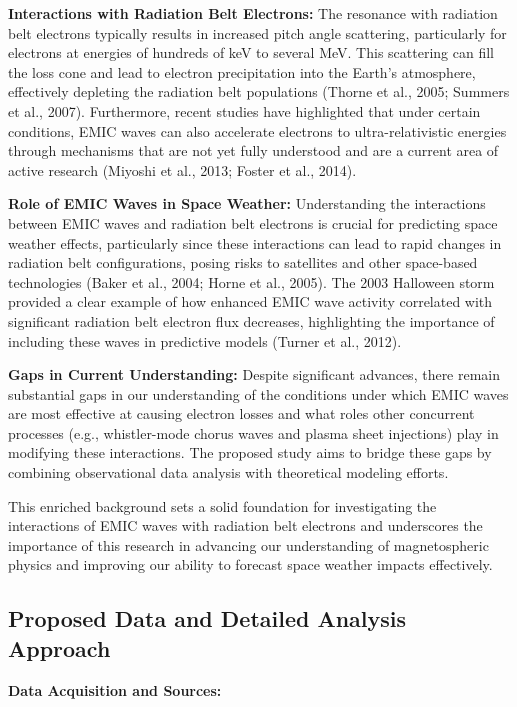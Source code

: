 \documentclass[
  letterpaper,
  DIV=11,
  numbers=noendperiod]{scrartcl}
\begin{document}
\textbf{Interactions with Radiation Belt Electrons:}
The resonance with radiation belt electrons typically results in increased pitch angle scattering, particularly for electrons at energies of hundreds of keV to several MeV. This scattering can fill the loss cone and lead to electron precipitation into the Earth's atmosphere, effectively depleting the radiation belt populations (Thorne et al., 2005; Summers et al., 2007). Furthermore, recent studies have highlighted that under certain conditions, EMIC waves can also accelerate electrons to ultra-relativistic energies through mechanisms that are not yet fully understood and are a current area of active research (Miyoshi et al., 2013; Foster et al., 2014).

\textbf{Role of EMIC Waves in Space Weather:}
Understanding the interactions between EMIC waves and radiation belt electrons is crucial for predicting space weather effects, particularly since these interactions can lead to rapid changes in radiation belt configurations, posing risks to satellites and other space-based technologies (Baker et al., 2004; Horne et al., 2005). The 2003 Halloween storm provided a clear example of how enhanced EMIC wave activity correlated with significant radiation belt electron flux decreases, highlighting the importance of including these waves in predictive models (Turner et al., 2012).

\textbf{Gaps in Current Understanding:}
Despite significant advances, there remain substantial gaps in our understanding of the conditions under which EMIC waves are most effective at causing electron losses and what roles other concurrent processes (e.g., whistler-mode chorus waves and plasma sheet injections) play in modifying these interactions. The proposed study aims to bridge these gaps by combining observational data analysis with theoretical modeling efforts.

This enriched background sets a solid foundation for investigating the interactions of EMIC waves with radiation belt electrons and underscores the importance of this research in advancing our understanding of magnetospheric physics and improving our ability to forecast space weather impacts effectively.

\subsection{Proposed Data and Detailed Analysis Approach}\label{proposed-data-and-detailed-analysis-approach}

\textbf{Data Acquisition and Sources:}
\end{document}
